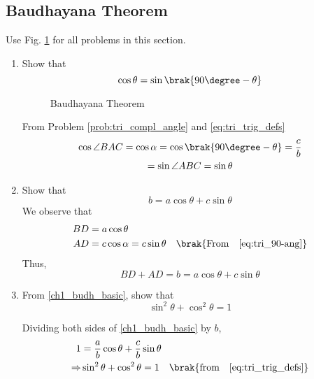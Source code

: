 \subsection{Baudhayana Theorem}
Use Fig. \ref{fig:tri_baudh} for all problems in this section.
\renewcommand{\theequation}{\theenumi}
\begin{enumerate}[label=\arabic*.,ref=\thesubsection.\theenumi]



\item  Show that
	\begin{equation}
	\cos \theta = \sin \brak{90\degree - \theta}
	\end{equation}


\begin{figure}[!ht]
	\begin{center}
		\resizebox{\columnwidth}{!}{}
	\end{center}
	\caption{Baudhayana Theorem}
	\label{fig:tri_baudh}	
\end{figure}


\solution From Problem \ref{prob:tri_compl_angle} and  \eqref{eq:tri_trig_defs}
%
\begin{multline}
\label{eq:tri_90-ang}
\cos \angle BAC = \cos \alpha =	\cos \brak{90\degree-\theta} = \frac{c}{b} 
\\
= \sin \angle ABC = \sin \theta
\end{multline}
%
\item
Show that 
%
\begin{equation}
\label{ch1_budh_basic}
b = a \cos \theta + c \sin \theta
\end{equation}
%
\solution We observe that
%
\begin{align}
BD &= a \cos \theta \\
AD &= c \cos\alpha = c \sin \theta \quad \brak{\text{From} \quad \eqref{eq:tri_90-ang}
}
\end{align}
%
Thus,
\begin{equation}
BD + AD = b = a \cos \theta + c \sin \theta
\end{equation}
\item
From \eqref{ch1_budh_basic}, show that
%
\begin{equation}
%
\label{eq:tri_sin_cos_id}
\sin ^2 \theta + \cos ^2 \theta = 1
\end{equation}


%
\solution Dividing both sides of \eqref{ch1_budh_basic} by $b$, 
\begin{align}
1 &= \frac{a}{b}\cos\theta + \frac{c}{b}\sin\theta\\
\Rightarrow &\sin ^2 \theta + \cos ^2 \theta = 1 \quad \brak{\text{from} \quad \eqref{eq:tri_trig_defs}}
\end{align}


\end{enumerate}
